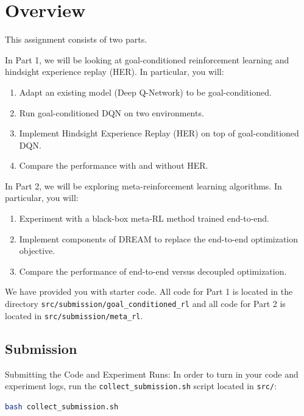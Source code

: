 \section{Overview}

This assignment consists of two parts.

In Part 1, we will be looking at goal-conditioned reinforcement learning and hindsight
experience replay (HER). In particular, you will:
\begin{enumerate}
    \item Adapt an existing model (Deep Q-Network) to be goal-conditioned.
    \item Run goal-conditioned DQN on two environments.
    \item Implement Hindsight Experience Replay (HER) \cite{andrychowicz2017hindsight} \cite{kaelbling1993learning} on top of goal-conditioned
    DQN.
    \item Compare the performance with and without HER.
\end{enumerate}
In Part 2, we will be exploring meta-reinforcement learning algorithms. In particular, you
will:
\begin{enumerate}
    \item Experiment with a black-box meta-RL method \cite{duan2016rl2} trained end-to-end.
    \item Implement components of DREAM \cite{liu2020explore} to replace the end-to-end optimization objective.
    \item Compare the performance of end-to-end versus decoupled optimization.
\end{enumerate}
We have provided you with starter code. All code for Part 1 is located in the directory \texttt{src/submission/goal\_conditioned\_rl} and all code
for Part 2 is located in \texttt{src/submission/meta\_rl}.

\subsection*{Submission}
Submitting the Code and Experiment Runs: In order to turn in your code and experiment
logs, run the \texttt{collect\_submission.sh} script located in \texttt{src/}:

\begin{lstlisting}[language=bash]
    bash collect_submission.sh
\end{lstlisting}